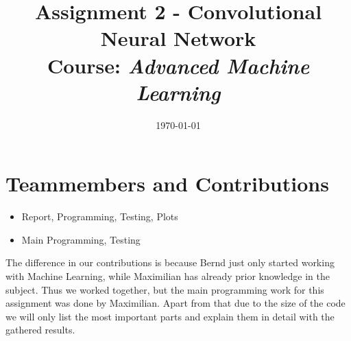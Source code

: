 \documentclass{article}
\title{Assignment 2 - Convolutional Neural Network\\
		{\large Course: \textit{Advanced Machine Learning}}}
\date{\today}
\begin{document}
	
	\maketitle
	
	\section{Teammembers and Contributions}
	\label{sec:TeammembersAndContributions}
	
	\begin{itemize}
		\item {} Report, Programming, Testing, Plots
		\item {} Main Programming, Testing
	\end{itemize}
	
	\noindent The difference in our contributions is because Bernd just only started working with Machine Learning, while Maximilian has already prior knowledge in the subject. Thus we worked together, but the main programming work for this assignment was done by Maximilian. Apart from that due to the size of the code we will only list the most important parts and explain them in detail with the gathered results. 
	
	
\end{document}
